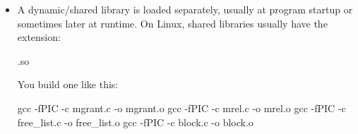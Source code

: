\documentclass{report}
\begin{document}
\begin{itemize}
\begin{itemize}
                    \item A dynamic/shared library is loaded separately, usually at program startup or sometimes later at runtime.
                        \bigbreak \noindent 
                        On Linux, shared libraries usually have the extension:
                        \bigbreak \noindent 
                        \begin{bashcode}
                        .so
                        \end{bashcode}
                        \bigbreak \noindent 
                        You build one like this:
                        \bigbreak \noindent 
                        \begin{bashcode}
                            gcc -fPIC -c mgrant.c -o mgrant.o
                            gcc -fPIC -c mrel.c -o mrel.o
                            gcc -fPIC -c free_list.c -o free_list.o
                            gcc -fPIC -c block.c -o block.o


\end{bashcode}
\end{itemize}
\end{itemize}
\end{document}
